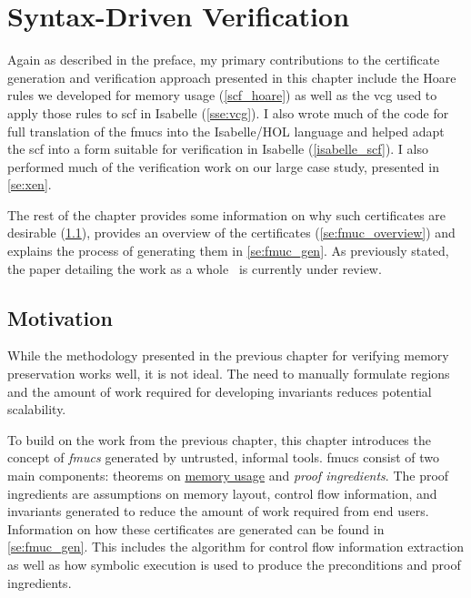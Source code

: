 \chapter{Syntax-Driven Verification}\label{ch:syntax}

Again as described in the preface,
my primary contributions to the certificate generation and verification approach%
presented in this chapter include the Hoare rules we developed
for memory usage (\cref{scf_hoare})
as well as the \ac{vcg} used to apply those rules
to \ac{scf} in Isabelle (\cref{sse:vcg}).
I also wrote much of the code for full translation of the \acp{fmuc}
into the Isabelle/HOL language
and helped adapt the \ac{scf} into a form suitable for verification
in Isabelle (\cref{isabelle_scf}).
I also performed much of the verification work on our large case study,
presented in \cref{se:xen}.

The rest of the chapter provides some information
on why such certificates are desirable (\cref{se:fmuc_motivation}),
provides an overview of the certificates (\cref{se:fmuc_overview})
and explains the process of generating them in \cref{se:fmuc_gen}.
As previously stated,
the paper detailing the work as a whole~\citep{popl2019underreview}
is currently under review.

\section{Motivation}\label{se:fmuc_motivation}
While the methodology presented in the previous chapter
for verifying memory preservation works well, it is not ideal.
The need to manually formulate regions
and the amount of work required for developing invariants
reduces potential scalability.

To build on the work from the previous chapter,
this chapter introduces the concept of \emph{\acp{fmuc}}
generated by untrusted, informal tools.
\Acp{fmuc} consist of two main components:
theorems on \hyperref[ch:memory]{memory usage} and \emph{proof ingredients}.%
The proof ingredients are assumptions on memory layout,
control flow information, and invariants
generated to reduce the amount of work required from end users.
Information on how these certificates are generated
can be found in \cref{se:fmuc_gen}.
This includes the algorithm for control flow information extraction
as well as how symbolic execution is used
to produce the preconditions and proof ingredients.

